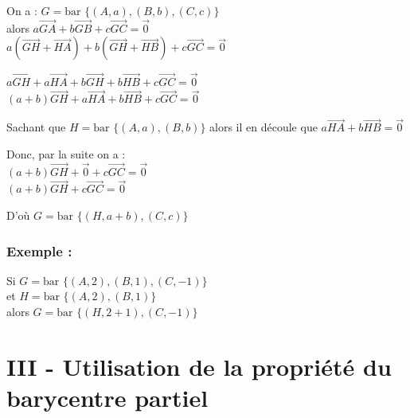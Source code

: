 \documentclass{article}
\begin{document}
\noindent On a : $G = \text{bar } \{(A, a), (B, b), (C, c)\}$ \\
alors $a \overrightarrow{GA} + b \overrightarrow{GB} + c \overrightarrow{GC} = \vec{0}$ \\
$a (\overrightarrow{GH} + \overrightarrow{HA}) + b (\overrightarrow{GH} + \overrightarrow{HB}) + c \overrightarrow{GC} = \vec{0}$

\noindent $a \overrightarrow{GH} + a \overrightarrow{HA} + b \overrightarrow{GH} + b \overrightarrow{HB} + c \overrightarrow{GC} = \vec{0}$ \\
$(a + b) \overrightarrow{GH} + a \overrightarrow{HA} + b \overrightarrow{HB} + c \overrightarrow{GC} = \vec{0}$

\vspace{1em}

\noindent Sachant que $H = \text{bar } \{(A, a), (B, b)\}$ alors il en découle que $a \overrightarrow{HA} + b \overrightarrow{HB} = \vec{0}$

\vspace{1em}

\noindent Donc, par la suite on a : \\
$(a + b) \overrightarrow{GH} + \vec{0} + c \overrightarrow{GC} = \vec{0}$ \\
$(a + b) \overrightarrow{GH} + c \overrightarrow{GC} = \vec{0}$

\vspace{1em}

\noindent D'où $G = \text{bar } \{(H, a + b), (C, c)\}$

\vspace{2em}

\subsubsection*{Exemple :}

\noindent Si $G = \text{bar } \{(A, 2), (B, 1), (C, -1)\}$ \\
et $H = \text{bar } \{(A, 2), (B, 1)\}$ \\
alors $G = \text{bar } \{(H, 2 + 1), (C, -1)\}$

\vspace{1.5em}

\begin{center}
\end{center}

\section*{III - Utilisation de la propriété du barycentre partiel}
\end{document}
